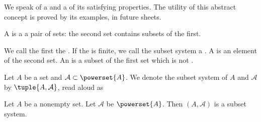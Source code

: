 

We speak of a
and a
of its
satisfying properties.
The utility of this
abstract concept
is proved by its examples,
in future sheets.


A
is a a pair of sets:
the second set contains
subsets of the first.

We call the first
the
.
If the
is finite,
we call the subset system a
.
A
is an element of the second set.
An
is a subset of the first set which is not
.



Let $A$ be a set and $\mathcal{A} \subset \powerset{A}$.
We denote the subset system of $A$ and $\mathcal{A}$
by $\tuple{A, \mathcal{A}}$, read aloud as 


\begin{expl}
Let $A$ be a nonempty set.
Let $\mathcal{A}$ be $\powerset{A}$.
Then $(A, \mathcal{A})$ is a subset system.
\end{expl}
